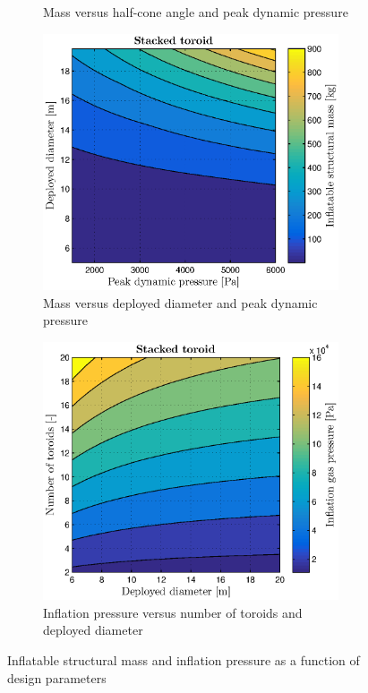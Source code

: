 \begin{figure}[h]
\begin{subfigure}[b]{0.49\textwidth}
		\caption{Mass versus half-cone angle and peak dynamic pressure}
		\label{fig:halfcone_strucmass}
	\end{subfigure}
	\begin{subfigure}[b]{0.49\textwidth}
		\includegraphics[width=0.96\textwidth]{./Figure/Structure/pressure_test.eps}
		\caption{Mass versus deployed diameter and peak dynamic pressure}
		\label{fig:press_strucmass}
	\end{subfigure}
	\begin{subfigure}[b]{0.49\textwidth}
		\includegraphics[width=0.96\textwidth]{./Figure/Structure/inflation_test.eps}
		\caption{Inflation pressure versus number of toroids and deployed diameter}
		\label{fig:inflpress_strucmass}
	\end{subfigure}
\caption{Inflatable structural mass and inflation pressure as a function of design parameters}
\end{figure}
